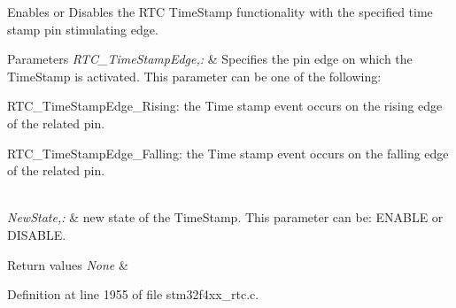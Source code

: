 Enables or Disables the R\-T\-C Time\-Stamp functionality with the specified time stamp pin stimulating edge. 


\begin{DoxyParams}{Parameters}
{\em R\-T\-C\-\_\-\-Time\-Stamp\-Edge,\-:} & Specifies the pin edge on which the Time\-Stamp is activated. This parameter can be one of the following\-: \begin{DoxyItemize}
\item R\-T\-C\-\_\-\-Time\-Stamp\-Edge\-\_\-\-Rising\-: the Time stamp event occurs on the rising edge of the related pin. \item R\-T\-C\-\_\-\-Time\-Stamp\-Edge\-\_\-\-Falling\-: the Time stamp event occurs on the falling edge of the related pin. \end{DoxyItemize}
\\
\hline
{\em New\-State,\-:} & new state of the Time\-Stamp. This parameter can be\-: E\-N\-A\-B\-L\-E or D\-I\-S\-A\-B\-L\-E. \\
\hline
\end{DoxyParams}

\begin{DoxyRetVals}{Return values}
{\em None} & \\
\hline
\end{DoxyRetVals}


Definition at line 1955 of file stm32f4xx\-\_\-rtc.\-c.

